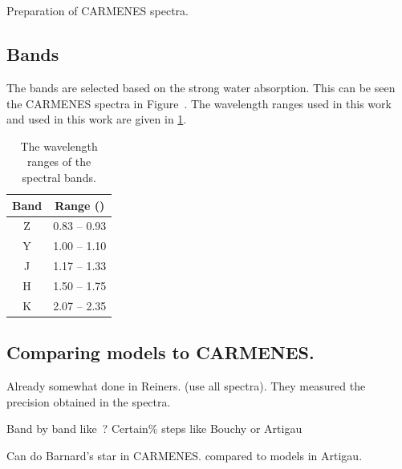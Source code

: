 \section{}
Preparation of {CARMENES} spectra.



\subsection{Bands}
The bands are selected based on the strong water absorption.
This can be seen the {CARMENES} spectra in Figure~.
The wavelength ranges used in this work~\citet{figueira_radial_2016} and used in this work are given in \cref{tab:band_ranges}.
\begin{table}
    \centering
    \caption{The wavelength ranges of the \nir{} spectral bands.}
    \begin{tabular}{cc}
        \toprule
        Band & Range (\um{})\\
        \midrule
        Z & 0.83 -- 0.93\\
        Y & 1.00 -- 1.10\\
        J & 1.17 -- 1.33\\
        H & 1.50 -- 1.75\\
        K & 2.07 -- 2.35\\
        \bottomrule
    \end{tabular}
    \label{tab:band_ranges}
\end{table}



\subsection{Comparing models to {CARMENES}.}
Already somewhat done in Reiners. (use all spectra).
They measured the precision obtained in the spectra.

Band by band like~\citet{figueira_radial_2016}?
Certain\% steps like Bouchy or Artigau


Can do Barnard's star in {CARMENES}.  compared to models in Artigau.

\DTLsetseparator{,}
%

